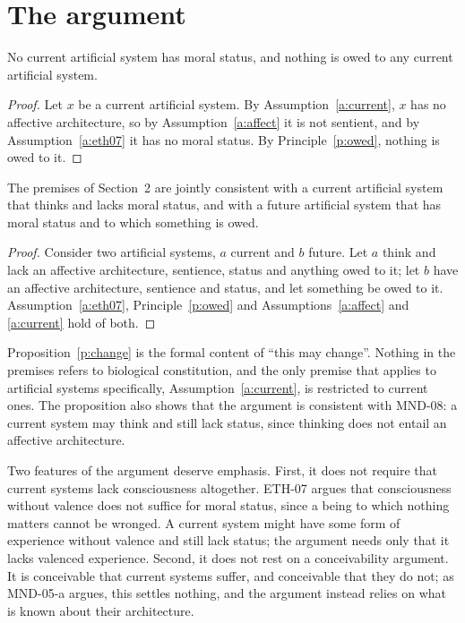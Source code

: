 \documentclass{situationist-preprint}
\begin{document}
\section{The argument}

\begin{theorem}\label{t:main}
No current artificial system has moral status, and nothing is owed to any current artificial system.
\end{theorem}

\begin{proof}
Let $x$ be a current artificial system. By Assumption~\ref{a:current}, $x$ has no affective architecture, so by Assumption~\ref{a:affect} it is not sentient, and by Assumption~\ref{a:eth07} it has no moral status. By Principle~\ref{p:owed}, nothing is owed to it.
\end{proof}

\begin{proposition}\label{p:change}
The premises of Section~2 are jointly consistent with a current artificial system that thinks and lacks moral status, and with a future artificial system that has moral status and to which something is owed.
\end{proposition}

\begin{proof}
Consider two artificial systems, $a$ current and $b$ future. Let $a$ think and lack an affective architecture, sentience, status and anything owed to it; let $b$ have an affective architecture, sentience and status, and let something be owed to it. Assumption~\ref{a:eth07}, Principle~\ref{p:owed} and Assumptions~\ref{a:affect} and \ref{a:current} hold of both.
\end{proof}

Proposition~\ref{p:change} is the formal content of \enquote{this may change}. Nothing in the premises refers to biological constitution, and the only premise that applies to artificial systems specifically, Assumption~\ref{a:current}, is restricted to current ones. The proposition also shows that the argument is consistent with MND-08: a current system may think and still lack status, since thinking does not entail an affective architecture.

Two features of the argument deserve emphasis. First, it does not require that current systems lack consciousness altogether. ETH-07 argues that consciousness without valence does not suffice for moral status, since a being to which nothing matters cannot be wronged. A current system might have some form of experience without valence and still lack status; the argument needs only that it lacks valenced experience. Second, it does not rest on a conceivability argument. It is conceivable that current systems suffer, and conceivable that they do not; as MND-05-a argues, this settles nothing, and the argument instead relies on what is known about their architecture.
\end{document}
